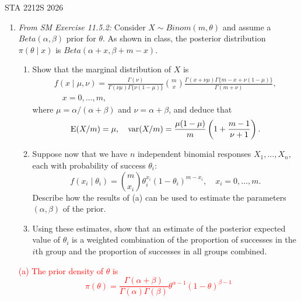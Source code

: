 \documentclass[12pt]{article}
\def\E{{\rm E}}
\newcommand{\1}{\mathds 1}
\begin{document}
 {\hfill STA 2212S 2026}\\


\bigskip

\begin{enumerate}

\item {\em From SM Exercise 11.5.2:} 
Consider $X \sim Binom(m,\theta)$  and assume a $Beta(\alpha,\beta)$ prior for $\theta$. As shown in class, the posterior distribution $\pi(\theta\mid x)$ is $Beta(\alpha+x, \beta+m-x)$. 
\begin{enumerate}
\item Show that the marginal distribution of $X$ is 
\begin{eqnarray*}
	f(x\mid \mu, \nu) = \frac{\Gamma(\nu)}{\Gamma(\nu\mu)\Gamma\{\nu(1-\mu)\}}{m\choose x} \frac{\Gamma(x+\nu\mu)\Gamma\{m-x+\nu(1-\mu)\}}{\Gamma(m+\nu)}, \\ \quad x=0, \dots, m,
\end{eqnarray*}
where $\mu=\alpha/(\alpha+\beta)$ and $\nu=\alpha+\beta$, and deduce that
\begin{eqnarray*}
	\E(X/m) = \mu, \quad \text{var}(X/m) = \frac{\mu(1-\mu)}{m}\left(1+\frac{m-1}{\nu+1}\right).
\end{eqnarray*}
\item Suppose now that we have $n$ independent binomial responses $X_1, \dots, X_n$, each with probability of success $\theta_i$:  $$f(x_i\mid \theta_i) = {m\choose x_i}\theta_i^{x_i}(1-\theta_i)^{m-x_i}, \quad x_i = 0, \dots, m.$$ 
Describe how the results of (a) can be used to estimate the parameters $(\alpha,\beta)$ of the prior. 
\item Using these estimates, show that an estimate of the posterior expected value of $\theta_i$ is a weighted combination of the proportion of successes in the $i$th group and the proportion of successes in all groups combined. 
\end{enumerate}
\textcolor{red}{(a) The prior density of $\theta$ is 
\begin{equation*}
    \pi(\theta) = \frac{\Gamma(\alpha + \beta)}{\Gamma(\alpha)\Gamma(\beta)}\theta^{\alpha-1}(1-\theta)^{\beta - 1}

\end{equation*}}
\end{enumerate}
\end{document}
